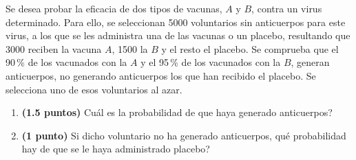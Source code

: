 
Se desea probar la eficacia de dos tipos de vacunas, $A$ y $B$, contra un
virus determinado. Para ello, se seleccionan 5000 voluntarios sin anticuerpos
para este virus, a los que se les administra una de las vacunas o un placebo,
resultando que 3000 reciben la vacuna $A$, 1500 la $B$ y el resto el placebo.
Se comprueba que el 90\,\% de los vacunados con la $A$ y el 95\,\% de los
vacunados con la $B$, generan anticuerpos, no generando anticuerpos los que
han recibido el placebo. Se selecciona uno de esos voluntarios al azar.
\begin{enumerate}[label=\alph*)]
  \item \textbf{(1.5 puntos)} \textquestiondown{}Cuál es la probabilidad de
  que haya generado anticuerpos?
  \item \textbf{(1 punto)} Si dicho voluntario no ha generado anticuerpos,
  \textquestiondown{}qué probabilidad hay de que se le haya administrado
  placebo?
\end{enumerate}
